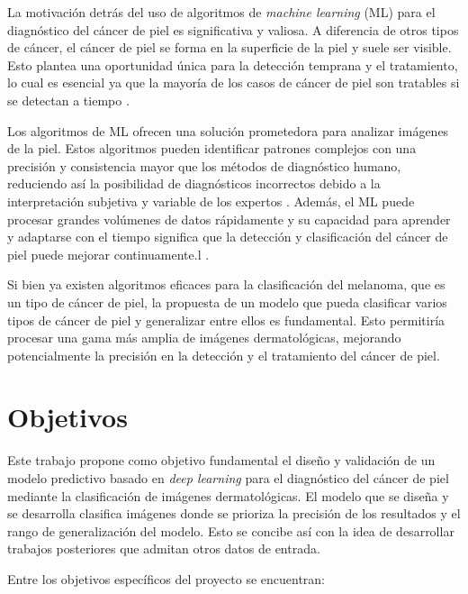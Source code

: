 La motivación detrás del uso de algoritmos de \textit{machine learning} (ML) para el diagnóstico del cáncer de piel es significativa y valiosa. A diferencia de otros tipos de cáncer, el cáncer de piel se forma en la superficie de la piel y suele ser visible. Esto plantea una oportunidad única para la detección temprana y el tratamiento, lo cual es esencial ya que la mayoría de los casos de cáncer de piel son tratables si se detectan a tiempo .

Los algoritmos de ML ofrecen una solución prometedora para analizar imágenes de la piel. Estos algoritmos pueden identificar patrones complejos con una precisión y consistencia mayor que los métodos de diagnóstico humano, reduciendo así la posibilidad de diagnósticos incorrectos debido a la interpretación subjetiva y variable de los expertos . Además, el ML puede procesar grandes volúmenes de datos rápidamente y su capacidad para aprender y adaptarse con el tiempo significa que la detección y clasificación del cáncer de piel puede mejorar continuamente.l .

Si bien ya existen algoritmos eficaces para la clasificación del melanoma, que es un tipo de cáncer de piel, la propuesta de un modelo que pueda clasificar varios tipos de cáncer de piel y generalizar entre ellos es fundamental. Esto permitiría procesar una gama más amplia de imágenes dermatológicas, mejorando potencialmente la precisión en la detección y el tratamiento del cáncer de piel.

\section*{Objetivos}

Este trabajo propone como objetivo fundamental el diseño y validación de un modelo predictivo basado en \textit{deep learning} para el diagnóstico del cáncer de piel mediante la clasificación de imágenes dermatológicas. El modelo que se diseña y se desarrolla clasifica imágenes donde se prioriza la precisión de los resultados y el rango de generalización del modelo. Esto se concibe así con la idea de desarrollar trabajos posteriores que admitan otros datos de entrada.

Entre los objetivos específicos del proyecto se encuentran:


